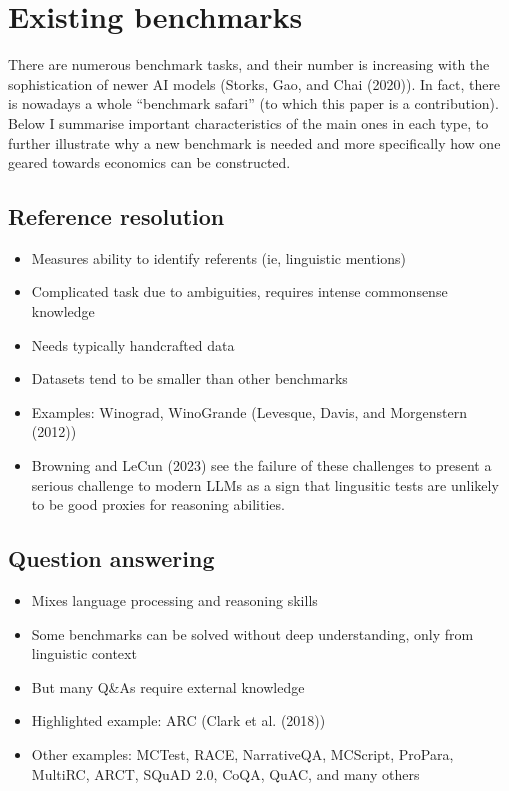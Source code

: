 \documentclass[
]{article}
\providecommand{\tightlist}{%
  \setlength{\itemsep}{0pt}\setlength{\parskip}{0pt}}\usepackage{longtable,booktabs,array}
\theoremstyle{plain}
\theoremstyle{definition}
\theoremstyle{remark}
\begin{document}
\section{Existing benchmarks}\label{sec-bench}

There are numerous benchmark tasks, and their number is increasing with
the sophistication of newer AI models (Storks, Gao, and Chai (2020)). In
fact, there is nowadays a whole ``benchmark safari'' (to which this
paper is a contribution). Below I summarise important characteristics of
the main ones in each type, to further illustrate why a new benchmark is
needed and more specifically how one geared towards economics can be
constructed.

\subsection{Reference resolution}\label{reference-resolution}

\begin{itemize}
\tightlist
\item
  Measures ability to identify referents (ie, linguistic mentions)
\item
  Complicated task due to ambiguities, requires intense commonsense
  knowledge
\item
  Needs typically handcrafted data
\item
  Datasets tend to be smaller than other benchmarks
\item
  Examples: Winograd, WinoGrande (Levesque, Davis, and Morgenstern
  (2012))
\item
  Browning and LeCun (2023) see the failure of these challenges to
  present a serious challenge to modern LLMs as a sign that lingusitic
  tests are unlikely to be good proxies for reasoning abilities.
\end{itemize}

\subsection{Question answering}\label{question-answering}

\begin{itemize}
\tightlist
\item
  Mixes language processing and reasoning skills
\item
  Some benchmarks can be solved without deep understanding, only from
  linguistic context
\item
  But many Q\&As require external knowledge
\item
  Highlighted example: ARC (Clark et al. (2018))
\item
  Other examples: MCTest, RACE, NarrativeQA, MCScript, ProPara, MultiRC,
  ARCT, SQuAD 2.0, CoQA, QuAC, and many others
\end{itemize}
\end{document}
